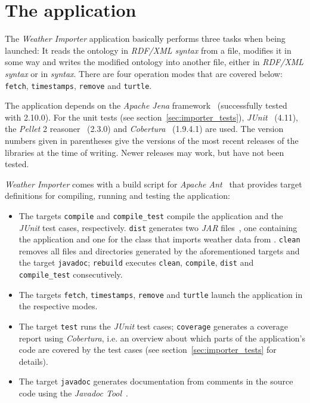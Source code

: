 \section{The application}
\label{sec:importer_application}

The \emph{Weather Importer} application basically performs three tasks when being launched: It reads the \smarthomeweather ontology in \emph{RDF/XML syntax}\cite{RDF_XML} from a file, modifies it in some way and writes the modified ontology into another file, either in \emph{RDF/XML syntax} or in \emph{ syntax}\cite{Turtle}. There are four operation modes that are covered below: \texttt{fetch}, \texttt{timestamps}, \texttt{remove} and \texttt{turtle}. %

The application depends on the \emph{Apache Jena} framework~\cite{apache_jena} (successfully tested with 2.10.0). For the unit tests (see section~\ref{sec:importer_tests}), \emph{JUnit}~\cite{junit} (4.11), the \emph{Pellet}  2 reasoner~\cite{pellet} (2.3.0) and \emph{Cobertura}~\cite{cobertura} (1.9.4.1) are used. The version numbers given in parentheses give the versions of the most recent releases of the libraries at the time of writing. Newer releases may work, but have not been tested.

\emph{Weather Importer} comes with a build script for \emph{Apache Ant}~\cite{apache_ant} that provides target definitions for compiling, running and testing the application:

\begin{itemize}
  \item The targets \texttt{compile} and \texttt{compile\_test} compile the application and the \emph{JUnit} test cases, respectively. \texttt{dist} generates two \emph{JAR} files~\cite{jar}, one containing the application and one for the class that imports weather data from \yrno. \texttt{clean} removes all files and directories generated by the aforementioned targets and the target \texttt{javadoc}; \texttt{rebuild} executes \texttt{clean}, \texttt{compile}, \texttt{dist} and \texttt{compile\_test} consecutively.
  \item The targets \texttt{fetch}, \texttt{timestamps}, \texttt{remove} and \texttt{turtle} launch the application in the respective modes.
  \item The target \texttt{test} runs the \emph{JUnit} test cases; \texttt{coverage} generates a coverage report using \emph{Cobertura}, i.e. an overview about which parts of the application's code are covered by the test cases (see section~\ref{sec:importer_tests} for details).
  \item The target \texttt{javadoc} generates documentation from comments in the source code using the \emph{Javadoc Tool}~\cite{javadoc}.
\end{itemize}

